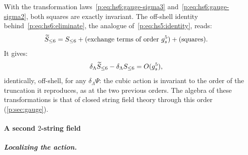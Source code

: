 With the transformation laws~\eqref{p:eq:hs6:gauge-sigma3} and~\eqref{p:eq:hs6:gauge-sigma2}, both squares are exactly invariant.
The off-shell identity behind~\eqref{p:eq:hs6:eliminate}, the analogue of~\eqref{p:eq:hs5:identity}, reads:
\begin{equation}
\caction[\le 6]
  = S_{\le 6}
    + (\text{exchange terms of order } \gs^5)
    + (\text{squares}).
\end{equation}
It gives:
\begin{equation}
  \label{p:eq:hs6:delta-S-equal}
  \delta_\Lambda \caction[\le 6] - \delta_\Lambda S_{\le 6}
    = O(\gs^5),
\end{equation}
identically, off-shell, for any $\delta_\Lambda \Psi$: the cubic action is invariant to the order of the truncation it reproduces, as at the two previous orders.
The algebra of these transformations is that of closed string field theory through this order (\cref{p:sec:gauge}).


\paragraph{A second \texorpdfstring{$2$}{2}-string field}
\label{p:sec:hs:sextic:partner}

\subparagraph{Localizing the action.}

